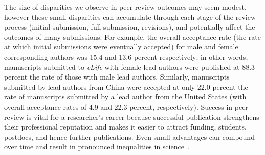 \documentclass[10pt,letterpaper]{article}
\begin{document}
The size of disparities we observe in peer review outcomes may seem modest, however these small disparities can accumulate through each stage of the review process (initial submission, full submission, revisions), and potentially affect the outcomes of many submissions. For example, the overall acceptance rate (the rate at which initial submissions were eventually accepted) for male and female corresponding authors was 15.4 and 13.6 percent respectively; in other words, manuscripts submitted to \textit{eLife} with female lead authors were published at 88.3 percent the rate of those with male lead authors. Similarly, manuscripts submitted by lead authors from China were accepted at only 22.0 percent the rate of manuscripts submitted by a lead author from the United States (with overall acceptance rates of 4.9 and 22.3 percent, respectively). Success in peer review is vital for a researcher’s career because successful publication strengthens their professional reputation and makes it easier to attract funding, students, postdocs, and hence further publications. Even small advantages can compound over time and result in pronounced inequalities in science~\cite{bol_matthew_2018, obrien_academic_2012, petersen_inequality_2014, day_big_2015}. 
\end{document}
